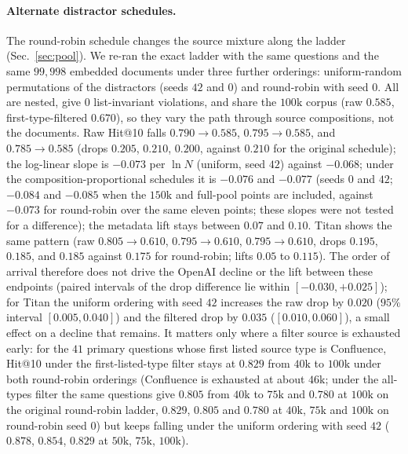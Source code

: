 \documentclass{ieeeaccess}
\makeatletter
\DeclareRobustCommand{\_}{\ifmmode\nfss@text{\textunderscore}\else\textunderscore\allowbreak\fi}
\makeatother
\begin{document}
\paragraph{Alternate distractor schedules.}
\label{sec:uniform}
The round-robin schedule changes the source mixture along the ladder (Sec.~\ref{sec:pool}). We re-ran the exact ladder with the same questions and the same $99{,}998$ embedded documents under three further orderings: uniform-random permutations of the distractors (seeds $42$ and $0$) and round-robin with seed $0$. All are nested, give $0$ list-invariant violations, and share the $100\text{k}$ corpus (raw $0.585$, first-type-filtered $0.670$), so they vary the path through source compositions, not the documents. Raw Hit@10 falls $0.790{\to}0.585$, $0.795{\to}0.585$, and $0.785{\to}0.585$ (drops $0.205$, $0.210$, $0.200$, against $0.210$ for the original schedule); the log-linear slope is $-0.073$ per $\ln N$ (uniform, seed $42$) against $-0.068$; under the composition-proportional schedules it is $-0.076$ and $-0.077$ (seeds $0$ and $42$; $-0.084$ and $-0.085$ when the $150\text{k}$ and full-pool points are included, against $-0.073$ for round-robin over the same eleven points; these slopes were not tested for a difference); the metadata lift stays between $0.07$ and $0.10$. Titan shows the same pattern (raw $0.805{\to}0.610$, $0.795{\to}0.610$, $0.795{\to}0.610$, drops $0.195$, $0.185$, and $0.185$ against $0.175$ for round-robin; lifts $0.05$ to $0.115$). The order of arrival therefore does not drive the OpenAI decline or the lift between these endpoints (paired intervals of the drop difference lie within $[-0.030,+0.025]$); for Titan the uniform ordering with seed $42$ increases the raw drop by $0.020$ ($95\%$ interval $[0.005,0.040]$) and the filtered drop by $0.035$ ($[0.010,0.060]$), a small effect on a decline that remains. It matters only where a filter source is exhausted early: for the $41$ primary questions whose first listed source type is Confluence, Hit@10 under the first-listed-type filter stays at $0.829$ from $40\text{k}$ to $100\text{k}$ under both round-robin orderings (Confluence is exhausted at about $46\text{k}$; under the all-types filter the same questions give $0.805$ from $40\text{k}$ to $75\text{k}$ and $0.780$ at $100\text{k}$ on the original round-robin ladder, $0.829$, $0.805$ and $0.780$ at $40\text{k}$, $75\text{k}$ and $100\text{k}$ on round-robin seed $0$) but keeps falling under the uniform ordering with seed $42$ ($0.878$, $0.854$, $0.829$ at $50\text{k}$, $75\text{k}$, $100\text{k}$). 
\end{document}
